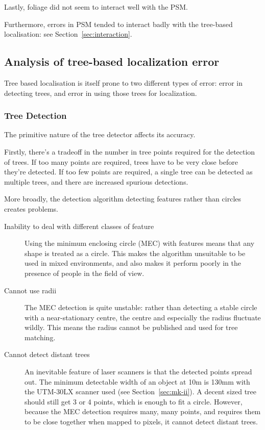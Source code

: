 \documentclass[12pt,oneside,a4paper]{book}
\begin{document}
Lastly, foliage did not seem to interact well with the PSM.

Furthermore, errors in PSM tended to interact badly with the
tree-based localisation: see Section~\ref{sec:interaction}.

\subsection{Analysis of tree-based localization error}
\label{sec:tree-error}

Tree based localisation is itself prone to two different types of
error: error in detecting trees, and error in using those trees for
localization.

\subsubsection{Tree Detection}
\label{sec:tree-detection}

The primitive nature of the tree detector affects its accuracy. 

Firstly, there's a tradeoff in the number in tree points required for
the detection of trees. If too many points are required, trees have to be very
close before they're detected. If too few points are required, a
single tree can be detected as multiple trees, and there are increased spurious detections.

More broadly, the detection algorithm detecting features rather than
circles creates problems.

\begin{description}
\item[Inability to deal with different classes of feature] Using the
  minimum enclosing circle (MEC) with features means that any shape is
  treated as a circle. This makes the algorithm unsuitable to be used
  in mixed environments, and also makes it perform poorly in the
  presence of people in the field of view.
\item[Cannot use radii] The MEC detection is quite unstable: rather
  than detecting a stable circle with a near-stationary centre, the
  centre and especially the radius fluctuate wildly. This means the
  radius cannot be published and used for tree matching.
\item[Cannot detect distant trees] An inevitable feature of laser
  scanners is that the detected points spread out. The minimum
  detectable width of an object at 10m is 130mm with the UTM-30LX
  scanner used (see Section~\ref{sec:mk-ii}). A decent sized tree
  should still get 3 or 4 points, which is enough to fit a
  circle. However, because the MEC detection requires many, many
  points, and requires them to be close together when mapped to
  pixels, it cannot detect distant trees.
\end{description}
\end{document}
